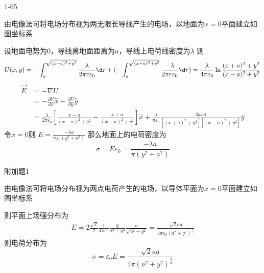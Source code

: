 \documentclass{phyasgn}
\begin{document}
{\heiti\color{red} 1-65}
\begin{sol}
由电像法可将电场分布视为两无限长导线产生的电场，以地面为$x=0$平面建立如图坐标系
\begin{figure}[!h]
\end{figure}
设地面电势为0，导线离地面距离为$a$，导线上电荷线密度为$\lambda$
则
$$U(x,y)=-\int_{a}^{\sqrt{(x-a)^2+y^2}}\frac{\lambda}{2\pi r\varepsilon_0}\d r+(-\int_{a}^{\sqrt{(x+a)^2+y^2}}\frac{-\lambda}{2\pi r\varepsilon_0}\d r)=
\frac{\lambda}{4\pi\varepsilon_0}\ln \frac{(x+a)^2+y^2}{(x-a)^2+y^2}$$
$$\begin{aligned}
  \vec{E}&=-\nabla U\\
  &=-\frac{\partial U}{\partial x}\hat{x}-\frac{\partial U}{\partial y}\hat{y}\\
  &=\frac{\lambda}{2\pi\varepsilon_0}[\frac{x-a}{(x-a)^2+y^2}-\frac{x+a}{(x+a)^2+y^2}]\hat{x}+\frac{\lambda}{\pi\varepsilon_0}\frac{2axy}{[(x+a)^2+y^2][(x-a)^2+y^2]}\hat{y}
\end{aligned}$$
令$x=0$则
$E=\frac{-\lambda a}{\pi\varepsilon_0(y^2+a^2)}$
那么地面上的电荷密度为
$$\sigma=E\varepsilon_0=\frac{-\lambda a}{\pi(y^2+a^2)}$$
\end{sol}\par

{\heiti\color{red} 附加题1}
\begin{sol}
由电像法可将电场分布视为两点电荷产生的电场，以导体平面为$x=0$平面建立如图坐标系
\begin{figure}[!h]
\end{figure}\par 
则平面上场强分布为
$$\begin{aligned}
  E=2\frac{\sqrt{2}}{2}\frac{1}{4\pi\varepsilon_0}\frac{q}{a^2+y^2}\frac{a}{\sqrt{a^2+y^2}}=\frac{\sqrt{2}aq}{4\pi\varepsilon_0(a^2+y^2)^\frac{3}{2}}
\end{aligned}$$
则电荷分布为
$$\sigma=\varepsilon_0E=\frac{\sqrt{2}aq}{4\pi(a^2+y^2)^\frac{3}{2}}$$
\end{sol}\par
\end{document}
